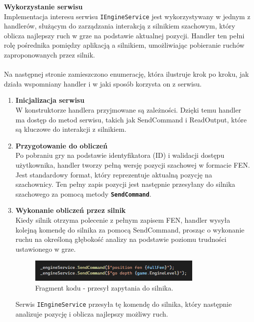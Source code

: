\documentclass[12pt,a4paper]{article}
\begin{document}
\noindent \textbf{Wykorzystanie serwisu}\\
Implementacja interesu serwisu \texttt{IEngineService} jest wykorzystywany w jednym z handlerów, służącym do zarządzania interakcją z silnikiem szachowym, który oblicza najlepszy ruch w grze na podstawie aktualnej pozycji. Handler ten pełni rolę pośrednika pomiędzy aplikacją a silnikiem, umożliwiając pobieranie ruchów zaproponowanych przez silnik.
\\\\
Na następnej stronie zamieszczono enumerację, która ilustruje krok po kroku, jak działa wspomniany handler i w jaki sposób korzysta on z serwisu.

\newpage

\begin{enumerate}
    \item \textbf{Inicjalizacja serwisu}\\
    W konstruktorze handlera przyjmowane są zależności. Dzięki temu handler ma dostęp do metod serwisu, takich jak SendCommand i ReadOutput, które są kluczowe do interakcji z silnikiem.

    \item \textbf{Przygotowanie do obliczeń}\\
    Po pobraniu gry na podstawie identyfikatora (ID) i walidacji dostępu użytkownika, handler tworzy pełną wersję pozycji szachowej w formacie FEN. Jest standardowy format, który reprezentuje aktualną pozycję na szachownicy. Ten pełny zapis pozycji jest następnie przesyłany do silnika szachowego za pomocą metody \texttt{\textbf{SendCommand}}.

    \item \textbf{Wykonanie obliczeń przez silnik}\\
    Kiedy silnik otrzyma polecenie z pełnym zapisem FEN, handler wysyła kolejną komendę do silnika za pomocą SendCommand, prosząc o wykonanie ruchu na określoną głębokość analizy na podstawie poziomu trudności ustawionego w grze.

    \begin{figure}[h!]
        \centering
        \includegraphics[width=0.8\textwidth]{images/ex_send_command.png}
        \caption{Fragment kodu - przesył zapytania do silnika.}
    \end{figure}

    Serwis \texttt{IEngineService} przesyła tę komendę do silnika, który następnie analizuje pozycję i oblicza najlepszy możliwy ruch.


\end{enumerate}
\end{document}

